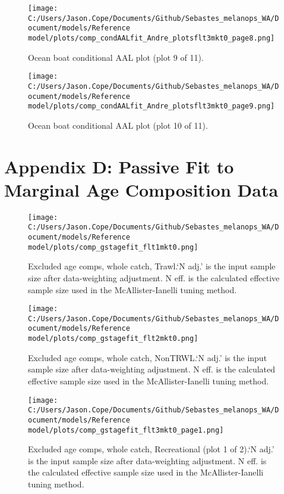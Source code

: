 \documentclass[11pt,
  english,
  letterpaper,
]{article}
\begin{document}
\begin{figure}
\centering
\texttt{[image: C:/Users/Jason.Cope/Documents/Github/Sebastes\_melanops\_WA/Document/models/Reference model/plots/comp\_condAALfit\_Andre\_plotsflt3mkt0\_page8.png]}
\caption{Ocean boat conditional AAL plot (plot 9 of 11).\label{fig:comp_condAALfit_Andre_plotsflt3mkt0_page8}}
\end{figure}

\begin{figure}
\centering
\texttt{[image: C:/Users/Jason.Cope/Documents/Github/Sebastes\_melanops\_WA/Document/models/Reference model/plots/comp\_condAALfit\_Andre\_plotsflt3mkt0\_page9.png]}
\caption{Ocean boat conditional AAL plot (plot 10 of 11).\label{fig:comp_condAALfit_Andre_plotsflt3mkt0_page9}}
\end{figure}

\clearpage

\hypertarget{app-d}{%
\section{Appendix D: Passive Fit to Marginal Age Composition Data}\label{app-d}}

\begin{figure}
\centering
\texttt{[image: C:/Users/Jason.Cope/Documents/Github/Sebastes\_melanops\_WA/Document/models/Reference model/plots/comp\_gstagefit\_flt1mkt0.png]}
\caption{Excluded age comps, whole catch, Trawl.`N adj.' is the input sample size after data-weighting adjustment. N eff. is the calculated effective sample size used in the McAllister-Ianelli tuning method.\label{fig:comp_gstagefit_flt1mkt0}}
\end{figure}

\begin{figure}
\centering
\texttt{[image: C:/Users/Jason.Cope/Documents/Github/Sebastes\_melanops\_WA/Document/models/Reference model/plots/comp\_gstagefit\_flt2mkt0.png]}
\caption{Excluded age comps, whole catch, NonTRWL.`N adj.' is the input sample size after data-weighting adjustment. N eff. is the calculated effective sample size used in the McAllister-Ianelli tuning method.\label{fig:comp_gstagefit_flt2mkt0}}
\end{figure}

\begin{figure}
\centering
\texttt{[image: C:/Users/Jason.Cope/Documents/Github/Sebastes\_melanops\_WA/Document/models/Reference model/plots/comp\_gstagefit\_flt3mkt0\_page1.png]}
\caption{Excluded age comps, whole catch, Recreational (plot 1 of 2).`N adj.' is the input sample size after data-weighting adjustment. N eff. is the calculated effective sample size used in the McAllister-Ianelli tuning method.\label{fig:comp_gstagefit_flt3mkt0_page1}}
\end{figure}
\end{document}
